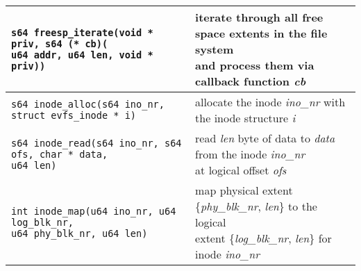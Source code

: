 \begin{table*}
\begin{center}
\begin{small}
\begin{tabular}[t]{|l|l|}
\hline 
\makecell[l]{\texttt{s64 freesp\_iterate(void * priv, s64 (* cb)(} \\ 
\hspace{1em}\texttt{u64 addr, u64 len, void * priv))}} & \makecell[l]{iterate through all free space extents in the file system \\ and process them via callback function \textit{cb}} \\
\hline
\hline
\texttt{s64 inode\_alloc(s64 ino\_nr, struct evfs\_inode * i)} & allocate the inode \textit{ino\_nr} with the inode structure \textit{i} \\
\hline 
\makecell[l]{\texttt{s64 inode\_read(s64 ino\_nr, s64 ofs, char * data,} \\
\hspace{7.85em}\texttt{u64 len)}} & \makecell[l]{read \textit{len} byte of data to \textit{data}
 from the inode \textit{ino\_nr} \\ at logical offset \textit{ofs}} \\
\hline 
\makecell[l]{\texttt{int inode\_map(u64 ino\_nr, u64 log\_blk\_nr,} \\
\hspace{7.3em}\texttt{u64 phy\_blk\_nr, u64 len)}} & \makecell[l]{map physical extent \{\textit{phy\_blk\_nr}, \textit{len}\} to the logical \\ extent \{\textit{log\_blk\_nr}, \textit{len}\} for inode \textit{ino\_nr}} \\
\hline 

\end{tabular}
\end{small}
\end{center}
\end{table*}
